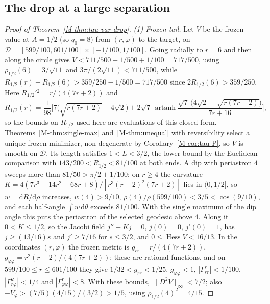 \documentclass[aip,jmp,amsmath,amssymb,reprint]{revtex4-2}
\newcommand{\dd}{\mathrm{d}}
\theoremstyle{plain}
\theoremstyle{definition}
\begin{document}
\subsection{The drop at a large separation}
\begin{proof}[Proof of Theorem~\ref{M-thm:tau-var-drop}]
\emph{(1) Frozen tail.} Let $V$ be the frozen value at $A=1/2$ (so $q_0=8$) from $(r,\varphi)$ to the target,
on $\mathcal D=[599/100,601/100]\times[-1/100,1/100]$. Going radially to $r=6$ and then along the circle
gives $V<711/500+1/500+1/100=717/500$, using $\rho_{1/2}(6)=3/\sqrt{11}$ and $3\pi/(2\sqrt{11})<711/500$, while
$R_{1/2}(r)+R_{1/2}(6)>359/250-1/500=717/500$ since $2R_{1/2}(6)>359/250$. Here $R_{1/2}'{}^2=r/(4(7r+2))$
and
\[
  R_{1/2}(r)=\frac1{98}\Big[7\big(\sqrt{r(7r+2)}-4\sqrt2\big)
  +2\sqrt7\,\operatorname{artanh}\frac{\sqrt7\,\big(4\sqrt2-\sqrt{r(7r+2)}\big)}{7r+16}\Big],
\]
so the bounds on $R_{1/2}$ used here are evaluations of this closed form. Theorems~\ref{M-thm:single-max}
and~\ref{M-thm:unequal} with reversibility select a unique frozen minimizer, non-degenerate by
Corollary~\ref{M-cor:tau-P}, so $V$ is smooth on $\mathcal D$. Its length satisfies $1<L<3/2$, the lower bound by
the Euclidean comparison with $143/200<R_{1/2}<81/100$ at both ends. A dip with periastron $4$ sweeps more
than $81/50>\pi/2+1/100$: on $r\ge4$ the curvature
$K=4(7r^3+14r^2+68r+8)/[r^3(r-2)^2(7r+2)]$ lies in $(0,1/2]$, so $w=\dd R/\dd\rho$ increases, $w(4)>9/10$,
$\rho(4)/\rho(599/100)<3/5<\cos(9/10)$, and each half-angle $\int w\,\dd\theta$ exceeds $81/100$. With the single
maximum of the dip angle this puts the periastron of the selected geodesic above $4$. Along it
$0<K\le1/2$, so the Jacobi field $j''+Kj=0$, $j(0)=0$, $j'(0)=1$, has $j\ge(13/16)s$ and $j'\ge7/16$ for
$s\le3/2$, and $0\le\operatorname{Hess}V<16/13$. In the coordinates $(r,\varphi)$ the frozen metric is $g_{rr}=r/(4(7r+2))$,
$g_{\varphi\varphi}=r^2(r-2)/(4(7r+2))$; these are rational functions, and on $599/100\le r\le601/100$ they give
$1/32<g_{rr}<1/25$, $g_{\varphi\varphi}<1$, $|\Gamma^r_{rr}|<1/100$, $|\Gamma^\varphi_{r\varphi}|<1/4$ and
$|\Gamma^r_{\varphi\varphi}|<8$. With these bounds, $\|D^2V\|_\infty<7/2$; also $-V_\varphi>(7/5)(4/15)/(3/2)>1/5$, using $\rho_{1/2}(4)^2=4/15$.


\end{proof}
\end{document}
